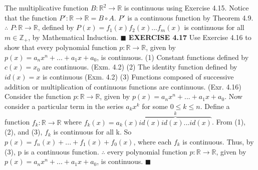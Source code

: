 \documentclass[12pt]{article}
\begin{document}
  \newline
  The multiplicative function \(B: \mathbb{R}^2 \rightarrow \mathbb{R}\) is continuous using Exercise 4.15.
  \newline \newline
  Notice that the function \(P': \mathbb{R} \rightarrow \mathbb{R} = B \circ A\).
  \newline
  \(P'\) is a continuous function by Theorem 4.9.
  \newline
  \(\therefore\) \(P: \mathbb{R} \rightarrow \mathbb{R}\), defined by \(P(x) = f_1(x)f_2(x)...f_m(x)\) is continuous for all \(m \in \mathbb{Z}_+\), by Mathematical Induction.
  \newline \(\blacksquare\)
  \newpage
  \noindent
  \textbf{EXERCISE 4.17}
  Use Exercise 4.16 to show that every polynomial function \(p: \mathbb{R} \rightarrow \mathbb{R}\), given by \(p(x) = a_nx^n + ... + a_1x + a_0\), is continuous.
  \newline \newline
  \newline
  (1) Constant functions defined by \(c(x) = x_0\) are continuous. (Exm. 4.2)
  \newline
  (2) The identity function defined by \(id(x) = x\) is continuous (Exm. 4.2)
  \newline
  (3) Functions composed of successive addition or multiplication of continuous functions are continuous. (Exr. 4.16)
  \newline \newline
  Consider the function \(p: \mathbb{R} \rightarrow \mathbb{R}\), given by \(p(x) = a_nx^n + ... + a_1x + a_0\).
  \newline
  Now consider a particular term in the series \(a_kx^k\) for some \(0 \leq k \leq n\).
  \newline
  Define a function \(f_k: \mathbb{R} \rightarrow \mathbb{R}\) where \(f_k(x) = a_k(x)\overbrace{id(x)id(x)...id(x)}^k\).
  \newline
  From (1), (2), and (3), \(f_k\) is continuous for all k.
  \newline \newline
  So \(p(x) = f_n(x) + ... + f_1(x) + f_0(x)\), where each \(f_k\) is continuous.
  \newline
  Thus, by (3), p is a continuous function.
  \newline \newline
  \(\therefore\) every polynomial function \(p: \mathbb{R} \rightarrow \mathbb{R}\), given by \(p(x) = a_nx^n + ... + a_1x + a_0\), is continuous.
  \newline \(\blacksquare\)
\end{document}
